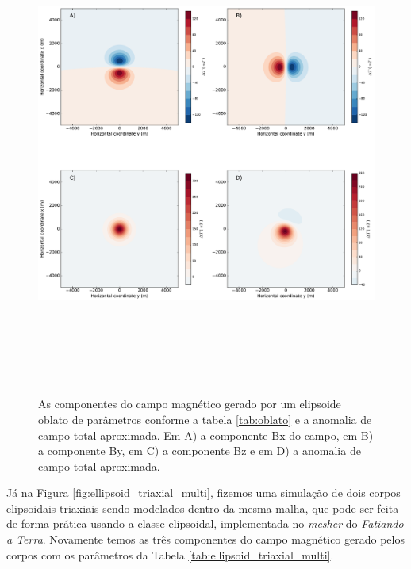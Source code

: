 \begin{figure}[hbt!]
	\centering \includegraphics[width=16cm,height=16cm]{figures/ellipsoid_oblate}
	\caption[As componentes do campo magnético gerado por um elipsoide oblato e a anomalia de campo total aproximada.]{As componentes 
		do campo magnético gerado por um elipsoide oblato de parâmetros conforme a tabela \ref{tab:oblato} e a anomalia de campo total aproximada. Em A) a componente Bx do campo, em B) a componente By, em C) a componente Bz e em D) a anomalia de campo total aproximada.}
	\label{fig:oblate}
\end{figure}

Já na Figura \ref{fig:ellipsoid_triaxial_multi}, fizemos uma simulação de dois corpos elipsoidais triaxiais sendo modelados dentro da mesma malha, que pode ser feita de forma prática usando a classe elipsoidal, implementada no \textit{mesher} do \textit{Fatiando a Terra}. Novamente temos as três componentes do campo magnético gerado pelos corpos com os parâmetros da Tabela \ref{tab:ellipsoid_triaxial_multi}.

